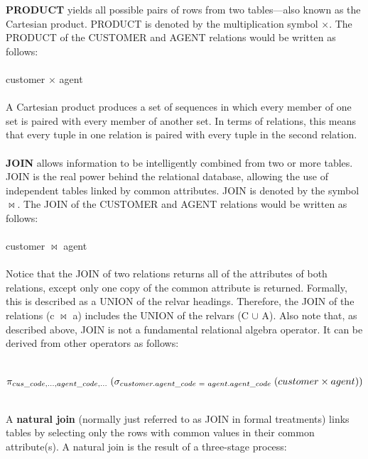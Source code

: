 \documentclass[a4paper, 12pt, titlepage]{report}
\begin{document}
{\textbf{PRODUCT} yields all possible pairs of rows from two tables—also known as the Cartesian product. PRODUCT is denoted by the multiplication symbol $\times$. The PRODUCT of the CUSTOMER and AGENT relations would be written as follows:\\ \\
customer $\times$ agent\\ \\
A Cartesian product produces a set of sequences in which every member of one set is paired with every member of another set. In terms of relations, this means that every tuple in one relation is paired with every tuple in the second relation.\\ \\
\textbf{JOIN} allows information to be intelligently combined from two or more tables. JOIN is the real power behind the relational database, allowing the use of independent tables linked by common attributes. JOIN is denoted by the symbol $\bowtie$. The JOIN of the CUSTOMER and AGENT relations would be written as follows:\\ \\
customer $\bowtie$ agent\\ \\
Notice that the JOIN of two relations returns all of the attributes of both relations, except only one copy of the common attribute is returned. Formally, this is described as a UNION of the relvar headings. Therefore, the JOIN of the relations (c $\bowtie$ a) includes the UNION of the relvars (C $\cup$ A). Also note that, as described above, JOIN is not a fundamental relational algebra operator. It can be derived from other operators as follows:\\ \\
\begin{large}
$\pi_{cus\_code, ..., agent\_code, ...} \hspace{0.1cm} (\sigma_{customer.agent\_code \hspace{0.1cm} = \hspace{0.1cm} agent.agent\_code} \hspace{0.1cm} (customer \times agent))$\\ \\
\end{large}
A \textbf{natural join} (normally just referred to as JOIN in formal treatments) links tables by selecting only the rows with common values in their
common attribute(s). A natural join is the result of a three-stage process:
\begin{enumerate}

\end{enumerate}}
\end{document}
